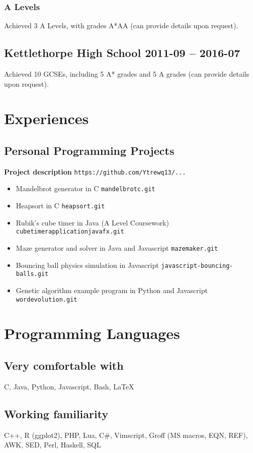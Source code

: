 \documentclass[10pt]{extarticle}
\begin{document}
    \subsubsection{A Levels}
    Achieved 3 A Levels, with grades A*AA (can provide details upon request).
    \begin{comment}
        \begin{tabular}{cccc}
            \textbf{Subject} & \textbf{Exam Board} & \textbf{AS/A2} &
            \textbf{Grade}\\
            Mathematics & AQA & A2 & A* \\
            Further Mathematics & AQA & A2 & A \\
            Computer Science & OCR & A2 & A \\
            Physics & AQA & AS & A
        \end{tabular}
    \end{comment}
    \subsection{Kettlethorpe High School
    \hfill 2011-09 -- 2016-07}
    Achieved 10 GCSEs, including 5 A* grades and 5 A grades (can provide details
    upon request).
    \section{Experiences}
    \subsection{Personal Programming Projects}
    \hspace{1em} \textbf{Project description}
    \hfill
    \texttt{https://github.com/Ytrewq13/...}
    \begin{itemize}
        \item Mandelbrot generator in C
            \hfill
            \texttt{mandelbrotc.git}
        \item Heapsort in C
            \hfill
            \texttt{heapsort.git}
        \item Rubik's cube timer in Java
            \hfill
            (A Level Coursework)
            \hfill
            \texttt{cubetimerapplicationjavafx.git}
        \item Maze generator and solver in Java and Javascript
            \hfill
            \texttt{mazemaker.git}
        \item Bouncing ball physics simulation in Javascript
            \hfill
            \texttt{javascript-bouncing-balls.git}
        \item Genetic algorithm example program in Python and Javascript
            \hfill
            \texttt{wordevolution.git}
    \end{itemize}
    \section{Programming Languages}
    \subsection{Very comfortable with}
    C, Java, Python, Javascript, Bash, \LaTeX
    \subsection{Working familiarity}
    C++, R (ggplot2), PHP, Lua, C\#, Vimscript, Groff (MS macros, EQN, REF),
    AWK, SED, Perl, Haskell, SQL
\end{document}
